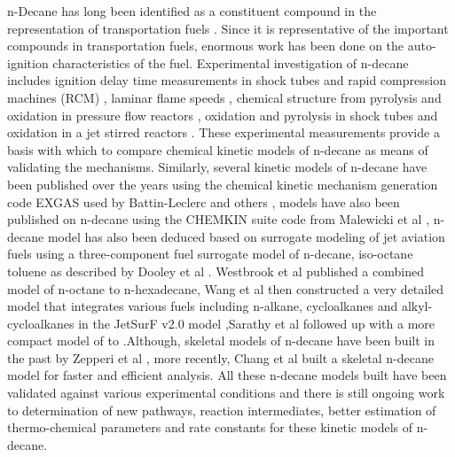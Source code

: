n-Decane has long been identified as a constituent compound in the representation of transportation fuels \cite{Dooley2010AProperties}. Since it is representative of the important compounds in transportation fuels, enormous work has been done on the auto-ignition characteristics of the fuel. Experimental investigation of n-decane includes ignition delay time measurements in shock tubes and rapid compression machines (RCM)  \cite{Pfahl1996Self-ignitionConditions}\cite{Malewicki2013ExperimentalN-dodecane}\cite{Zhukov2008AutoignitionPressure}\cite{Horning2002StudyMixtures}\cite{Shen2009APressures}\cite{Dean2007AutoignitionPressures}\cite{Olchanski2006DecaneTube}\cite{Kumar2009AutoignitionConditions}\cite{Haylett2012IgnitionTube}, laminar flame speeds \cite{Zhao2004BURNING-DECANE}\cite{KUMAR2007209}\cite{Ji2010PropagationFlames}\cite{Moghaddas2012LaminarPressures}\cite{Hui2013LaminarPressures}\cite{Singh2011ExperimentalFlames}, chemical structure from pyrolysis and oxidation in pressure flow reactors \cite{Zeppieri2000ModelingPyrolysis}\cite{Jahangirian2012APressures}\cite{Zeng2014ExperimentalN-decane}\cite{Gong2014ExperimentalN-decane}, oxidation and pyrolysis in shock tubes \cite{Malewicki2013ExperimentalN-dodecane}\cite{Tekawade2016Time-resolvedN-dodecane} and oxidation in a jet stirred reactors \cite{Herbinet2013LowN-decane}\cite{Dagaut2008OxidationStudy}\cite{Battin-Leclerc2008DetailedSurrogates}\cite{Biet2008ExperimentalAlkanes}. These experimental measurements provide a basis with which to compare chemical kinetic models of n-decane as means of validating the mechanisms. Similarly, several kinetic models of n-decane have been published over the years using the chemical kinetic mechanism generation code EXGAS \cite{Warth2000ComputerOxidation} used by Battin-Leclerc and others \cite{Battin-Leclerc2000ModelingK}\cite{Biet2008ExperimentalAlkanes}, models have also been published on n-decane using the CHEMKIN suite code from Malewicki et al \cite{Malewicki2013ExperimentalN-dodecane}, n-decane model has also been deduced based on surrogate modeling of jet aviation fuels using a three-component fuel surrogate model of n-decane, iso-octane toluene as described by Dooley et al \cite{Dooley2010MethylModel}. Westbrook et al \cite{Westbrook2009AN-hexadecane} published a combined model of n-octane to n-hexadecane, Wang et al then constructed a very detailed model that integrates various fuels including n-alkane, cycloalkanes and alkyl-cycloalkanes in the JetSurF v2.0 model \cite{Wang2010A2.0},Sarathy et al followed up with a more compact model of  to  \cite{Sarathy2011ComprehensiveC20}.Although, skeletal models of n-decane have been built in the past by Zepperi et al \cite{Zeppieri2000ModelingPyrolysis}, more recently, Chang et al \cite{CHANG20131315} built a skeletal n-decane model for faster and efficient analysis. All these n-decane models built have been validated against various experimental conditions and there is still ongoing work to determination of new pathways, reaction intermediates, better estimation of thermo-chemical parameters and rate constants for these kinetic models of n-decane. \par
\par


